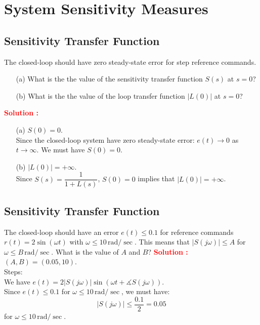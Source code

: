 \documentclass[12pt]{article}
\begin{document}
\section{System Sensitivity Measures}
\subsection{Sensitivity Transfer Function}

The closed-loop should have zero steady-state error for step reference commands. 

\begin{itemize}
    \item[(a)] What is the the value of the sensitivity transfer function $S(s)$ at $s= 0$?
    \item[(b)] What is the the value of the loop transfer function $|L(0)|$ at $s= 0$?
    \end{itemize}

\textbf{\textcolor{red}{Solution :}} \\
\begin{itemize}
    \item[(a)] $S(0) = 0$.  \\
    Since the closed-loop system have zero steady-state error: $e(t) \to 0$ as $t \to \infty$. We must have $S(0) = 0$. 
    \item[(b)] $|L(0)| = +\infty$.  \\
    Since $S(s) = \dfrac{1}{1+L(s)}$, $S(0) = 0$ implies that $|L(0)| = +\infty$.  
\end{itemize}

\clearpage
\subsection{Sensitivity Transfer Function}

The closed-loop should have an error $e(t) \le 0.1$ for reference commands $r(t) = 2 \sin(\omega t)$  with $\omega \le 10 \,\text{rad}/\sec$. This means that $|S(j\omega)|\le A$ for $\omega \le B\,\text{rad}/\sec$. What is the value of $A$ and $B$?
\textbf{\textcolor{red}{Solution :}} \\
$(A,B) = (0.05, 10)$. \\
Steps: \\
We have $e(t) = 2 |S(j\omega)| \sin(\omega t + \measuredangle S(j\omega))$. \\
Since $e(t) \le 0.1$ for $\omega \le 10 \,\text{rad}/\sec$, we must have:
$$|S(j\omega)| \le \frac{0.1}{2} = 0.05$$
for $\omega \le 10 \,\text{rad}/\sec$. 
\clearpage
\end{document}
